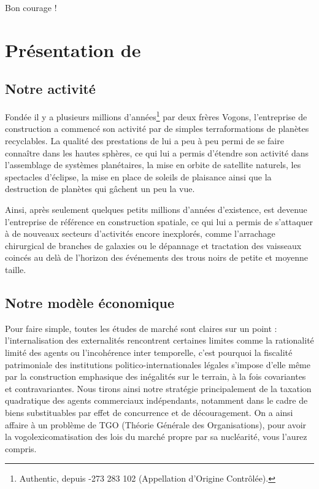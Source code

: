 Bon courage !

\section{Présentation de \provogon{}}

\subsection{Notre activité}

Fondée il y a plusieurs millions d'années\footnote{\provogon{} Authentic,
depuis -273 283 102 (Appellation d'Origine Contrôlée).} par deux frères Vogons,
l'entreprise de construction \provogon{} a commencé son activité par de simples
terraformations de planètes recyclables.  La qualité des prestations de
\provogon{} lui a peu à peu permi de se faire connaître dans les hautes
sphères, ce qui lui a permis d'étendre son activité dans l'assemblage de
systèmes planétaires, la mise en orbite de satellite naturels, les spectacles
d'éclipse, la mise en place de soleils de plaisance ainsi que la destruction de
planètes qui gâchent un peu la vue.

Ainsi, après seulement quelques petits millions d'années d'existence, \provogon{}
est devenue l'entreprise de référence en construction spatiale, ce qui lui a
permis de s'attaquer à de nouveaux secteurs d'activités encore inexplorés,
comme l'arrachage chirurgical de branches de galaxies ou le dépannage et
tractation des vaisseaux coincés au delà de l'horizon des événements des trous
noirs de petite et moyenne taille.

\subsection{Notre modèle économique}

Pour faire simple, toutes les études de marché sont claires sur un point :
l'internalisation des externalités rencontrent certaines limites comme la
rationalité limité des agents ou l'incohérence inter temporelle, c'est pourquoi
la fiscalité patrimoniale des institutions politico-internationales légales
s'impose d'elle même par la construction emphasique des inégalités sur le
terrain, à la fois covariantes et contravariantes. Nous tirons ainsi notre
stratégie principalement de la taxation quadratique des agents commerciaux
indépendants, notamment dans le cadre de biens substituables par effet de
concurrence et de découragement. On a ainsi affaire à un problème de TGO
(Théorie Générale des Organisations), pour avoir la vogolexicomatisation des
lois du marché propre par sa nucléarité, vous l'aurez compris.

